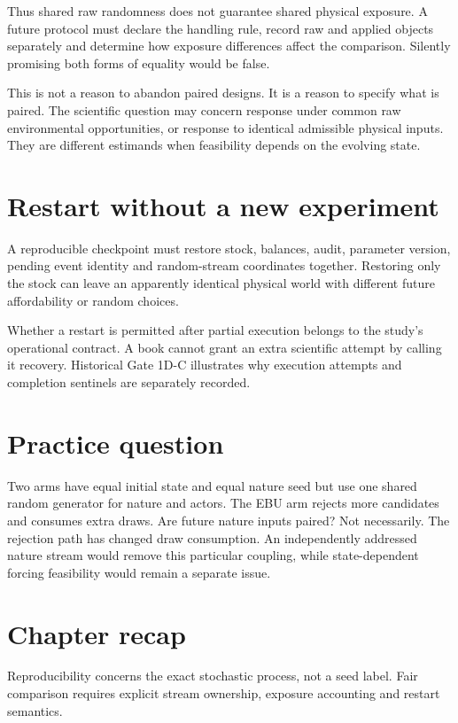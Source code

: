 Thus shared raw randomness does not guarantee shared physical exposure.
A future protocol must declare the handling rule, record raw and applied
objects separately and determine how exposure differences affect the
comparison. Silently promising both forms of equality would be false.

This is not a reason to abandon paired designs. It is a reason to specify
what is paired. The scientific question may concern response under common
raw environmental opportunities, or response to identical admissible
physical inputs. They are different estimands when feasibility depends on
the evolving state.

\section{Restart without a new experiment}
A reproducible checkpoint must restore stock, balances, audit, parameter
version, pending event identity and random-stream coordinates together.
Restoring only the stock can leave an apparently identical physical world
with different future affordability or random choices.

Whether a restart is permitted after partial execution belongs to the
study's operational contract. A book cannot grant an extra scientific
attempt by calling it recovery. Historical Gate 1D-C illustrates why
execution attempts and completion sentinels are separately recorded.

\section*{Practice question}
Two arms have equal initial state and equal nature seed but use one shared
random generator for nature and actors. The EBU arm rejects more candidates
and consumes extra draws. Are future nature inputs paired? Not necessarily.
The rejection path has changed draw consumption. An independently addressed
nature stream would remove this particular coupling, while state-dependent
forcing feasibility would remain a separate issue.

\section*{Chapter recap}
Reproducibility concerns the exact stochastic process, not a seed label.
Fair comparison requires explicit stream ownership, exposure accounting
and restart semantics.
